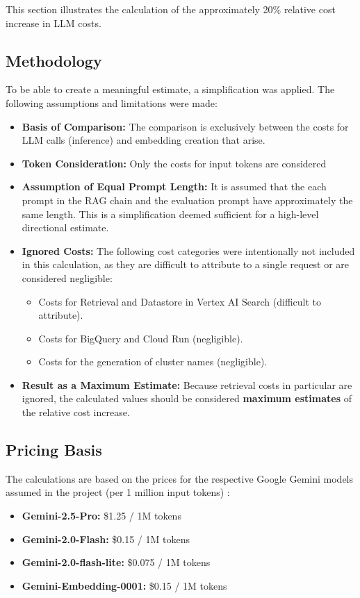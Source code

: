 \documentclass[
	english,
	ruledheaders=section,%
	class=report,%
	thesis={type=bachelor},%
	accentcolor=1b,%
	custommargins=true,%
	marginpar=false,%
	parskip=half-,%
	fontsize=11pt,%
	DIV=14,
]{tudapub}
\begin{document}
This section illustrates the calculation of the approximately 20\% relative cost increase in LLM costs.
\subsection*{Methodology}
To be able to create a meaningful estimate, a simplification was applied. The following assumptions and limitations were made:
\begin{itemize}
    \item \textbf{Basis of Comparison:} The comparison is exclusively between the costs for LLM calls (inference) and embedding creation that arise.
    \item \textbf{Token Consideration:} Only the costs for input tokens are considered
    \item \textbf{Assumption of Equal Prompt Length:} It is assumed that the each prompt in the RAG chain and the evaluation prompt have approximately the same length. This is a simplification deemed sufficient for a high-level directional estimate.
    \item \textbf{Ignored Costs:} The following cost categories were intentionally not included in this calculation, as they are difficult to attribute to a single request or are considered negligible: \begin{itemize}
        \item Costs for Retrieval and Datastore in Vertex AI Search (difficult to attribute).
        \item Costs for BigQuery and Cloud Run (negligible).
        \item Costs for the generation of cluster names (negligible).
    \end{itemize}
    \item \textbf{Result as a Maximum Estimate:} Because retrieval costs in particular are ignored, the calculated values should be considered \textbf{maximum estimates} of the relative cost increase.
\end{itemize}
\subsection*{Pricing Basis}
The calculations are based on the prices for the respective Google Gemini models assumed in the project (per 1 million input tokens) \parencite{GoogleGeminiPricing}:
\begin{itemize}
    \item \textbf{Gemini-2.5-Pro:} \$1.25 / 1M tokens
    \item \textbf{Gemini-2.0-Flash:} \$0.15 / 1M tokens
    \item \textbf{Gemini-2.0-flash-lite:} \$0.075 / 1M tokens
    \item \textbf{Gemini-Embedding-0001:} \$0.15 / 1M tokens
\end{itemize}
\end{document}
